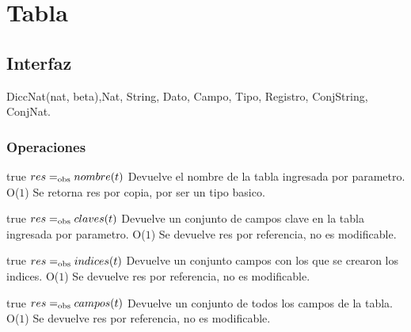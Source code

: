 



\section{Tabla}

\subsection{Interfaz}

 {DiccNat(nat, beta),}{Nat, String, Dato, Campo, Tipo, Registro, ConjString, ConjNat.}




\subsubsection*{Operaciones}



 {true}
 {$res =_{\mathrm{obs}} nombre(t)$}
 {Devuelve el nombre de la tabla ingresada por parametro.}
 {O($1$)}
 {Se retorna res por copia, por ser un tipo basico.}

 {true}
 {$res =_{\mathrm{obs}} claves(t)$}
 {Devuelve un conjunto de campos clave en la tabla ingresada por parametro.}
 {O($1$)}
 {Se devuelve res por referencia, no es modificable.}
 
 {true}
 {$res =_{\mathrm{obs}} indices(t)$}
 {Devuelve un conjunto campos con los que se crearon los indices.}
 {O($1$)}
 {Se devuelve res por referencia, no es modificable.}
 
 {true}
 {$res =_{\mathrm{obs}} campos(t)$}
 {Devuelve un conjunto de todos los campos de la tabla.}
 {O($1$)}
 {Se devuelve res por referencia, no es modificable.}

